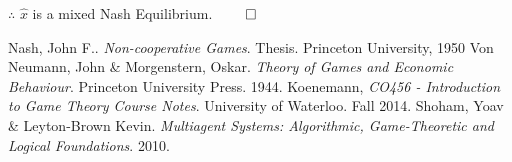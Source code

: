 \documentclass[12pt]{article}
\begin{document}
$\therefore$ $\hat{x}$ is a mixed Nash Equilibrium.
$\qed$

\newpage
\begin{thebibliography}{10}
 Nash, John F.. \textit{Non-cooperative Games}.  Thesis.  Princeton University, 1950
 Von Neumann, John \& Morgenstern, Oskar. \textit{Theory of Games and Economic Behaviour}. Princeton University Press. 1944.
 Koenemann, \textit{CO456 - Introduction to Game Theory Course Notes}. University of Waterloo. Fall 2014.
 Shoham, Yoav \& Leyton-Brown Kevin. \textit{Multiagent Systems: Algorithmic, Game-Theoretic and Logical Foundations}. 2010.

\end{thebibliography}
\end{document}
